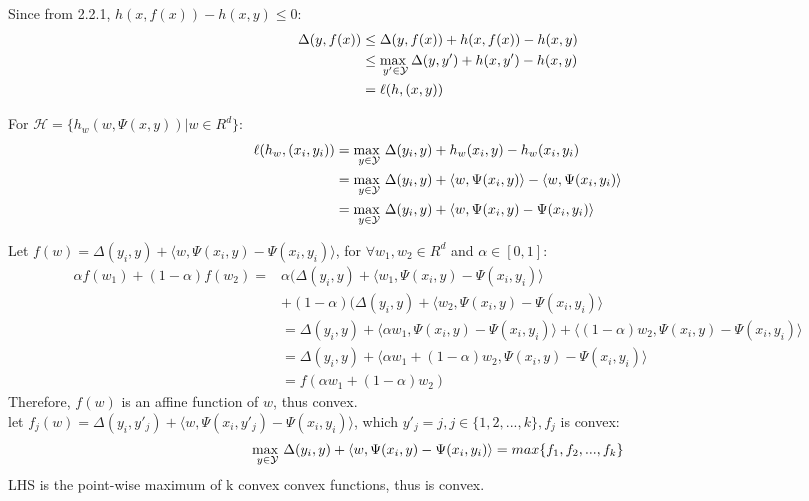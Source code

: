 \documentclass{article}
\newenvironment{sub}[2][$-$]{\begin{trivlist}
		\item[\hskip \labelsep {\bfseries #1}\hskip \labelsep {\bfseries #2.}]}  {\end{trivlist}}
\begin{document}
\begin{sub}{2.2.2}
\end{sub}
Since from 2.2.1, $h(x,f(x)) - h(x,y) \leq 0$:
\begin{align}
\Delta(y,f(x)) &\leq  \Delta(y,f(x))   +h(x,f(x)) - h(x,y) \\
&\leq \underset{y' \in \mathcal{Y}}{\operatorname{max \hspace{0.05 in}}}  \Delta(y,y')   +h(x,y') - h(x,y)\\
& =\ell(h,(x,y))
\end{align}

\begin{sub}{2.2.3}
\end{sub}
For $\mathcal{H} = \{h_w(w,\Psi(x,y)) | w\in R^d \}$:
\begin{align}
\ell(h_w,(x_i,y_i)) &= \underset{y \in \mathcal{Y}}{\operatorname{max \hspace{0.05 in}}}  \Delta(y_i,y)   +h_w(x_i,y) - h_w(x_i,y_i)\\
&= \underset{y \in \mathcal{Y}}{\operatorname{max \hspace{0.05 in}}}  \Delta(y_i,y)   +\langle w, \Psi(x_i,y) \rangle- \langle w, \Psi(x_i,y_i) \rangle\\
& = \underset{y \in \mathcal{Y}}{\operatorname{max \hspace{0.05 in}}}  \Delta(y_i,y)   +\langle w, \Psi(x_i,y) - \Psi(x_i,y_i) \rangle
\end{align}


\begin{sub}{2.2.4}
\end{sub}

Let $f(w) = \Delta(y_i,y)   +\langle w, \Psi(x_i,y) - \Psi(x_i,y_i) \rangle$, for $\forall w_1,w_2 \in R^d$ and $\alpha \in [0,1]:$
\begin{align}
\alpha f(w_1) + (1-\alpha)f(w_2)=&\alpha( \Delta(y_i,y)   +\langle w_1, \Psi(x_i,y) - \Psi(x_i,y_i)\rangle \\&+ (1- \alpha)( \Delta(y_i,y)   +\langle w_2, \Psi(x_i,y) - \Psi(x_i,y_i)\rangle\\
&=  \Delta(y_i,y)   +\langle \alpha w_1, \Psi(x_i,y) - \Psi(x_i,y_i)\rangle + \langle (1-\alpha) w_2, \Psi(x_i,y) - \Psi(x_i,y_i)\rangle\\
&=  \Delta(y_i,y)  + \langle \alpha w_1 + (1 -\alpha) w_2, \Psi(x_i,y) - \Psi(x_i,y_i)\rangle \\
 &= f(\alpha w_1 + (1-\alpha) w_2)
\end{align}
Therefore, $f(w)$ is an affine function of $w$, thus convex.\\
let $f_j (w)= \Delta(y_i,y'_j)   +\langle w, \Psi(x_i,y'_j) - \Psi(x_i,y_i)\rangle$, which $y'_j =j, j \in \{1,2,...,k\}, f_j$ is convex:
\begin{align}
\underset{y \in \mathcal{Y}}{\operatorname{max \hspace{0.05 in}}} \Delta(y_i,y)   +\langle w, \Psi(x_i,y) - \Psi(x_i,y_i) \rangle = max\{f_1, f_2 ,...,f_k\}
\end{align}
LHS is the point-wise maximum of k convex convex functions, thus is convex. 
\end{document}
